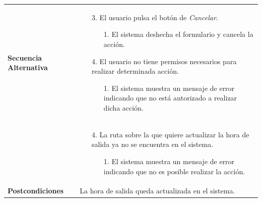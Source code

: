 \begin{longtable}{| p{4cm} | p{10cm} |}
\\
\hline
\textbf{Secuencia Alternativa} &\mbox{}\par\vspace{-\baselineskip}
\begin{enumerate}[leftmargin=0.7cm, topsep=0.1cm]
\item[3.] El usuario pulsa el botón de \textit{Cancelar}.
	\begin{itemize}
	\item[1.] El sistema deshecha el formulario y cancela la acción.
	\end{itemize}
\item[4.] El usuario no tiene permisos necesarios para realizar determinada acción.
	\begin{itemize}
	\item[1.] El sistema muestra un mensaje de error indicando que no está autorizado a realizar dicha acción.
	\end{itemize}
\end{enumerate}
\\ &\mbox{}\par\vspace{-\baselineskip}	
\begin{enumerate}[leftmargin=0.7cm, topsep=0.1cm]
\item[4.] La ruta sobre la que quiere actualizar la hora de salida ya no se encuentra en el sistema.
	\begin{itemize}
	\item[1.] El sistema muestra un mensaje de error indicando que no es posible realizar la acción.
	\end{itemize}
\end{enumerate}
\\

\hline
\textbf{Postcondiciones} & 
La hora de salida queda actualizada en el sistema.\\
\hline
\end{longtable}



\newpage
